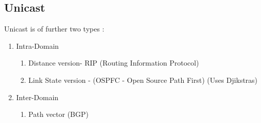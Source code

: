 \documentclass[11pt,letterpaper]{article}
\begin{document}
\subsection{Unicast}
Unicast is of further two types :
\begin{enumerate}
  \item Intra-Domain
    \begin{enumerate}
      \item Distance version- RIP (Routing Information Protocol)
      \item Link State version - (OSPFC - Open Source Path First) (Uses Djikstras)
    \end{enumerate}
  \item Inter-Domain
    \begin{enumerate}
      \item Path vector (BGP)
    \end{enumerate}
\end{enumerate}
\end{document}

